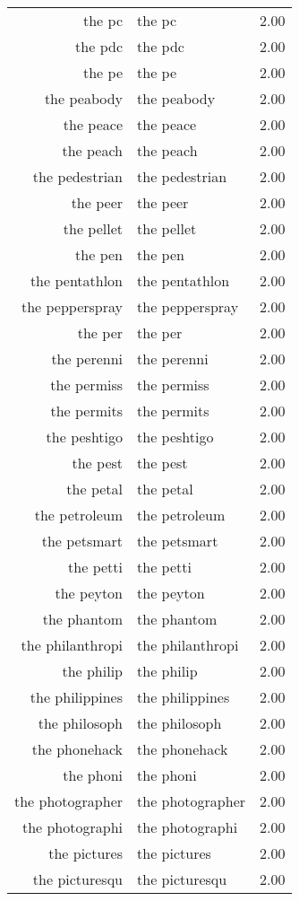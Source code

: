 \begin{table}[ht]
\begin{tabular}{rlr}
  the pc & the pc & 2.00 \\ 
  the pdc & the pdc & 2.00 \\ 
  the pe & the pe & 2.00 \\ 
  the peabody & the peabody & 2.00 \\ 
  the peace & the peace & 2.00 \\ 
  the peach & the peach & 2.00 \\ 
  the pedestrian & the pedestrian & 2.00 \\ 
  the peer & the peer & 2.00 \\ 
  the pellet & the pellet & 2.00 \\ 
  the pen & the pen & 2.00 \\ 
  the pentathlon & the pentathlon & 2.00 \\ 
  the pepperspray & the pepperspray & 2.00 \\ 
  the per & the per & 2.00 \\ 
  the perenni & the perenni & 2.00 \\ 
  the permiss & the permiss & 2.00 \\ 
  the permits & the permits & 2.00 \\ 
  the peshtigo & the peshtigo & 2.00 \\ 
  the pest & the pest & 2.00 \\ 
  the petal & the petal & 2.00 \\ 
  the petroleum & the petroleum & 2.00 \\ 
  the petsmart & the petsmart & 2.00 \\ 
  the petti & the petti & 2.00 \\ 
  the peyton & the peyton & 2.00 \\ 
  the phantom & the phantom & 2.00 \\ 
  the philanthropi & the philanthropi & 2.00 \\ 
  the philip & the philip & 2.00 \\ 
  the philippines & the philippines & 2.00 \\ 
  the philosoph & the philosoph & 2.00 \\ 
  the phonehack & the phonehack & 2.00 \\ 
  the phoni & the phoni & 2.00 \\ 
  the photographer & the photographer & 2.00 \\ 
  the photographi & the photographi & 2.00 \\ 
  the pictures & the pictures & 2.00 \\ 
  the picturesqu & the picturesqu & 2.00 \\ 

\end{tabular}
\end{table}

